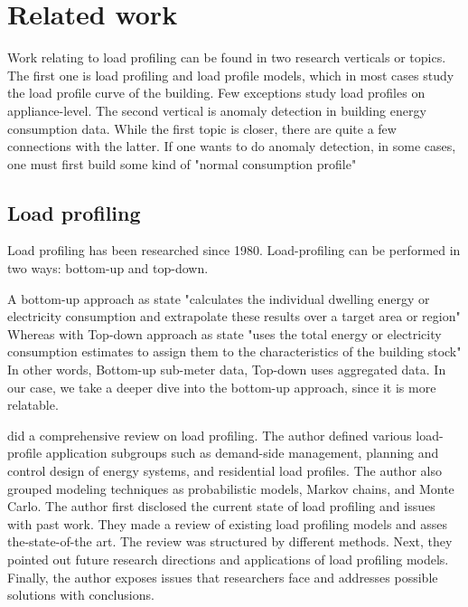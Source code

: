 \label{chapter3}
\chapter{Related work}

Work relating to load profiling can be found in two research verticals or topics. The first one is load profiling and load profile models, which in 
most cases study the load profile curve of the building. Few exceptions study load profiles on appliance-level.
The second vertical is anomaly detection in building energy consumption data. While the first topic is closer, there are quite a few connections with the latter. 
If one wants to do anomaly detection, in some cases, one must first build some kind of "normal consumption profile" 

\section{Load profiling}

Load profiling has been researched since 1980. Load-profiling can be performed in two ways: bottom-up and top-down. 

A bottom-up approach as \cite{SWAN20091819} state "calculates the individual dwelling energy or electricity consumption and extrapolate these results over a target area or region"
Whereas with Top-down approach as \cite{SWAN20091819} state "uses the total energy or electricity consumption estimates to assign them to the characteristics of the building stock"
In other words, Bottom-up sub-meter data, Top-down uses aggregated data. In our case, we take a deeper dive into the bottom-up approach, since it is more relatable.

\cite{Review2021} did a comprehensive review on load profiling. The author defined various load-profile application
subgroups such as demand-side management, planning and control design of energy systems, and residential load profiles. The author also 
grouped modeling techniques as probabilistic models, Markov chains, and Monte Carlo. The author first disclosed the current state of load profiling and issues with past work.
They made a review of existing load profiling models
and asses the-state-of-the art. The review was structured by different methods. Next, they pointed out future research directions
and applications of load profiling models. Finally, the author exposes issues that researchers face and addresses possible solutions with conclusions.

